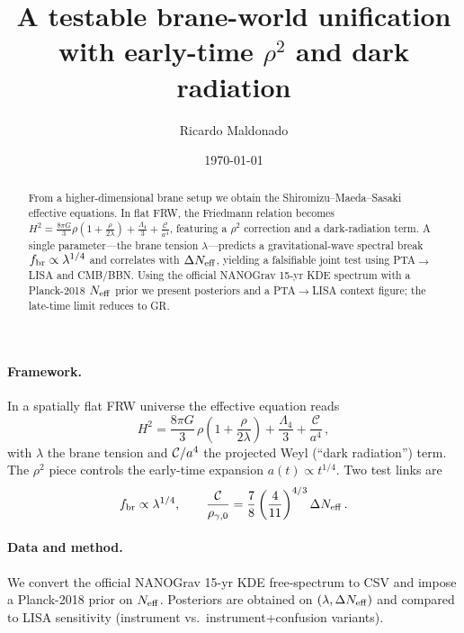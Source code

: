 \documentclass[reprint,aps,prl,showkeys,amsmath,amssymb,floatfix]{revtex4-2}
\begin{document}
\title{A testable brane-world unification with early-time $\rho^2$ and dark radiation}
\author{Ricardo Maldonado}
\date{\today}

\begin{abstract}
From a higher-dimensional brane setup we obtain the Shiromizu--Maeda--Sasaki effective equations. In flat FRW, the Friedmann relation becomes
$H^2=\frac{8\pi G}{3}\rho\!\left(1+\frac{\rho}{2\lambda}\right)+\frac{\Lambda_4}{3}+\frac{\mathcal{C}}{a^{4}}$,
featuring a $\rho^2$ correction and a dark-radiation term. A single parameter---the brane tension $\lambda$---predicts a gravitational-wave spectral break $f_{\rm br}\propto \lambda^{1/4}$ and correlates with $\Delta N_{\rm eff}$, yielding a falsifiable joint test using PTA$\to$LISA and CMB/BBN. Using the official NANOGrav 15-yr KDE spectrum with a Planck-2018 $N_{\rm eff}$ prior we present posteriors and a PTA$\to$LISA context figure; the late-time limit reduces to GR.
\end{abstract}

\maketitle

\paragraph{Framework.} In a spatially flat FRW universe the effective equation reads
\begin{equation}
H^2=\frac{8\pi G}{3}\,\rho\!\left(1+\frac{\rho}{2\lambda}\right)+\frac{\Lambda_4}{3}+\frac{\mathcal{C}}{a^{4}}\,,\label{eq:frw}
\end{equation}
with $\lambda$ the brane tension and ${\cal C}/a^4$ the projected Weyl (``dark radiation'') term. The $\rho^2$ piece controls the early-time expansion $a(t)\propto t^{1/4}$. Two test links are
\begin{equation}
f_{\rm br}\propto \lambda^{1/4},\qquad \frac{\mathcal{C}}{\rho_{\gamma,0}}=\frac{7}{8}\left(\frac{4}{11}\right)^{4/3}\Delta N_{\rm eff}\,.
\end{equation}

\paragraph{Data and method.} We convert the official NANOGrav 15-yr KDE free-spectrum to CSV and impose a Planck-2018 prior on $N_{\rm eff}$. Posteriors are obtained on $(\lambda,\Delta N_{\rm eff})$ and compared to LISA sensitivity (instrument vs.\ instrument+confusion variants).
\end{document}
